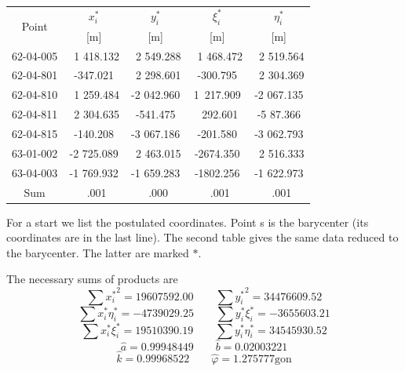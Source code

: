 \begin{table}[htbp]
	\begin{tabular}{ccccc}
		\toprule
		\multirow{2}{*}{Point} & $x_{i}^{\ast}$ & $y_{i}^{\ast}$ & $\xi_{i}^{\ast}$ & $\eta_{i}^{\ast}$ \\
		{} &[m] & [m] & [m] & [m]\\
		\midrule
		62-04-005 &\ 1 418.132  &\ 2 549.288  &\ 1 468.472 &\ 2 519.564\\
		62-04-801 &-347.021     &\ 2 298.601  & -300.795   &\ 2 304.369\\
		62-04-810 &\ 1 259.484  & -2 042.960  &1\ 217.909  &-2 067.135\\
		62-04-811 &\ 2 304.635  &-541.475     &\ 292.601   &-5 87.366\\
		62-04-815 &-140.208     &-3 067.186   &-201.580    &-3 062.793\\
		63-01-002 &-2 725.089   &\ 2 463.015  &-2674.350   &\ 2 516.333\\
		63-04-003 &-1 769.932   &-1 659.283   &-1802.256   &-1 622.973\\
		Sum       &\ .001       &\ .000       &\ .001      &\ .001\\
		\bottomrule
	\end{tabular}
\end{table}
\par
For a start we list the postulated coordinates. Point s is the barycenter (its coordinates are in the last line). The second table gives the same data reduced to the barycenter. The latter are marked $*$.
\par
The necessary sums of products are
\begin{equation*}
\sum{{x_{i}^\ast}}^{2} = 19 607 592.00 \qquad \sum{{y_{i}^\ast}}^{2} = 34476 609.52
\end{equation*}
\begin{equation*}
\sum x_{i}^{\ast}\eta_{i}^{\ast} = -4739 029.25 \qquad \sum y_{i}^{\ast}\xi_{i}^{\ast} =  -3 655 603.21
\end{equation*}
\begin{equation*}
\sum x_{i}^{\ast}\xi_{i}^{\ast} = 19 510390.19 \qquad \sum y_{i}^{\ast}\eta_{i}^{\ast} = 34 545 930.52
\end{equation*}
\begin{equation*}
\hat{a} = 0.99948449 \qquad \hat{b} = 0.020032 21
\end{equation*}
\begin{equation*}
\hat{k} = 0.999 685 22 \qquad \hat{\varphi} = 1.275 777 \text{gon}
\end{equation*}
